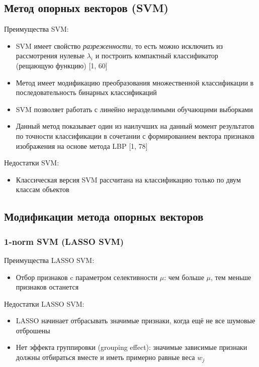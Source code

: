 \documentclass[12pt,a4paper]{article}
\begin{document}
\subsection{Метод опорных векторов (SVM)}
Преимущества SVM:
\begin{itemize}
    \item SVM имеет свойство \textit{разреженности}, то есть можно исключить из рассмотрения нулевые $\lambda_i$ и построить компактный классификатор (рещающую функцию) [1, 60]
    \item Метод имеет модификацию преобразования множественной классификации в последовательность бинарных классификаций
    \item SVM позволяет работать с линейно неразделимыми обучающими выборками
    \item Данный метод показывает один из наилучших на данный момент результатов по точности классификации в сочетании с формированием вектора признаков изображения на основе метода LBP [1, 78]
\end{itemize}

Недостатки SVM:
\begin{itemize}
    \item Классическая версия SVM рассчитана на классификацию только по двум классам объектов
\end{itemize}

\subsection{Модификации метода опорных векторов}

\subsubsection{1-norm SVM (LASSO SVM)}
Преимущества LASSO SVM:
\begin{itemize}
	\item  Отбор признаков c параметром селективности $\mu$:
	чем больше $\mu$, тем меньше признаков останется	
\end{itemize}

Недостатки LASSO SVM:
\begin{itemize}
	\item  LASSO начинает отбрасывать значимые признаки,
	когда ещё не все шумовые отброшены
	\item  Нет эффекта группировки (grouping effect):
	значимые зависимые признаки должны отбираться вместе
	и иметь примерно равные веса $w_j$
\end{itemize}
\end{document}
